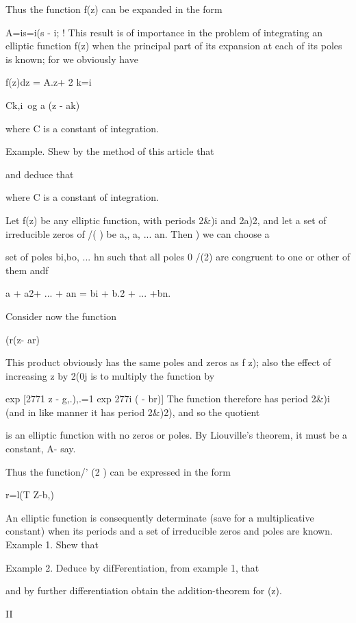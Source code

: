 {Thus the function f(z) can be expanded in the form

A=is=i(s - i; ! This result is of importance in the problem of
integrating an elliptic function f(z) when the principal part of its
expansion at each of its poles is known; for we obviously have

f(z)dz = A.z+ 2 k=i

Ck,i\ og a (z - ak)

where C is a constant of integration.

Example. Shew by the method of this article that

and deduce that

where C is a constant of integration.


Let f(z) be any elliptic function, with periods 2\&)i and 2a)2, and
let a set of irreducible zeros of /( ) be a,, a, ... an. Then
) we can choose a

%
%

set of poles bi,bo, ... hn such that all poles 0 /(2) are congruent to
one or other of them andf

a + a2+ ... + an = bi + b.2 + ... +bn.

Consider now the function

  (r(z- ar)

This product obviously has the same poles and zeros as f z); also the
effect of increasing z by 2(0j is to multiply the function by

  exp [2771 z - g,.),.=1 exp 277i ( - br)] The function therefore has
period 2\&)i (and in like manner it has period 2\&)2), and so the
quotient

is an elliptic function with no zeros or poles. By Liouville's
theorem, it must be a constant, A- say.

Thus the function/' (2 ) can be expressed in the form

r=l(T Z-b,)

An elliptic function is consequently determinate (save for a
multiplicative constant) when its periods and a set of irreducible
zeros and poles are known. Example 1. Shew that

Example 2. Deduce by difFerentiation, from example 1, that

and by further differentiation obtain the addition-theorem for (z).

II

}
